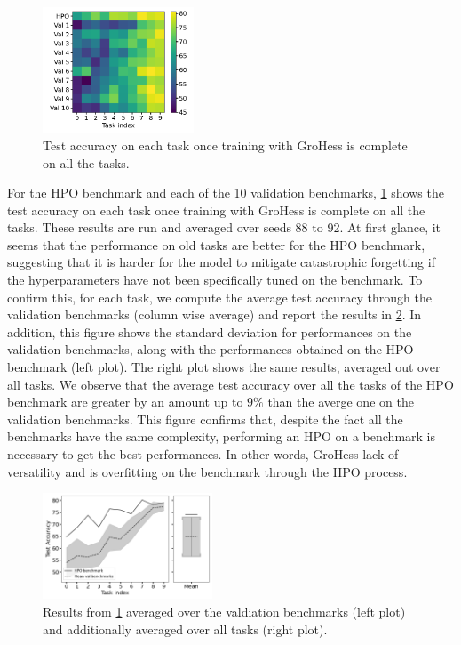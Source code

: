 \documentclass[11pt]{article}
\begin{document}
\begin{figure}
    \centering
    \includegraphics[width=0.4\textwidth]{images/val_accs_matrix.png}
    \caption{Test accuracy on each task once training with GroHess is complete on all the tasks.}
    \label{fig:val_accs_matrix}
\end{figure}

\vspace{2mm}
\noindent
For the HPO benchmark and each of the 10 validation benchmarks, \ref{fig:val_accs_matrix} shows the test accuracy on each task once training with GroHess is complete on all the tasks. These results are run and averaged over seeds 88 to 92. At first glance, it seems that the performance on old tasks are better for the HPO benchmark, suggesting that it is harder for the model to mitigate catastrophic forgetting if the hyperparameters have not been specifically tuned on the benchmark. To confirm this, for each task, we compute the average test accuracy through the validation benchmarks (column wise average) and report the results in \ref{fig:accuracy_through_benchmarks}. In addition, this figure shows the standard deviation for performances on the validation benchmarks, along with the performances obtained on the HPO benchmark (left plot). The right plot shows the same results, averaged out over all tasks. We observe that the average test accuracy over all the tasks of the HPO benchmark are greater by an amount up to $9\%$ than the averge one on the validation benchmarks. This figure confirms that, despite the fact all the benchmarks have the same complexity, performing an HPO on a benchmark is necessary to get the best performances. In other words, GroHess lack of versatility and is overfitting on the benchmark through the HPO process.

\begin{figure}
    \centering
    \includegraphics[width=0.45\textwidth]{images/accuracy_through_benchmarks.png}
    \caption{Results from \ref{fig:val_accs_matrix} averaged over the valdiation benchmarks (left plot) and additionally averaged over all tasks (right plot).}
    \label{fig:accuracy_through_benchmarks}
\end{figure}
\end{document}
